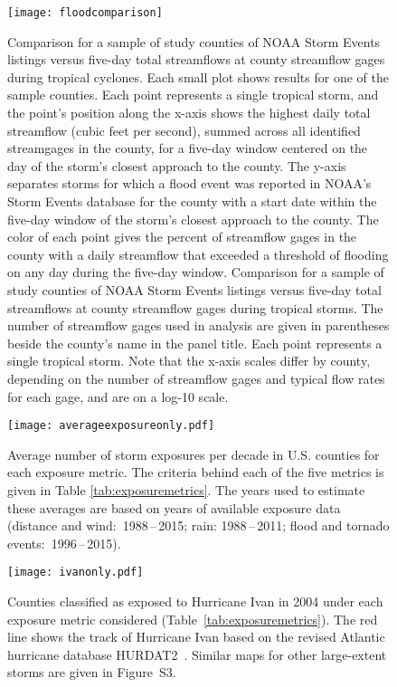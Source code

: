 \begin{figure}[tbhp!]
\centering
\texttt{[image: floodcomparison]}
\caption{Comparison for a sample of study counties of NOAA Storm Events 
	listings versus five-day total streamflows at county streamflow 
	gages during tropical cyclones. Each small plot shows results for 
	one of the sample counties. Each point represents a single tropical 
	storm, and the point's position along the x-axis shows the highest 
	daily total streamflow (cubic feet per second), summed across all 
	identified streamgages in the county, for a five-day window centered 
	on the day of the storm's closest approach to the county. The y-axis 
	separates storms for which a flood event was reported in NOAA's Storm Events 
	database for the county with a start date within the five-day window 
	of the storm's closest approach to the county. The color of each point 
	gives the percent of streamflow gages in the county with a daily streamflow 
	that exceeded a threshold of flooding on any day during the five-day window.
	Comparison for a sample of study counties of NOAA Storm Events 
	listings versus five-day total streamflows at county streamflow gages during 
	tropical storms. The number of streamflow gages used in analysis are given in 
	parentheses beside the county's name in the panel title. Each point represents 
	a single tropical storm. Note that the x-axis scales differ by county, 
	depending on the number of streamflow gages and typical flow rates for each 
	gage, and are on a log-10 scale.}
\label{fig:floodcomparison}
\end{figure}

\clearpage

\begin{figure}%
\centering
\texttt{[image: averageexposureonly.pdf]} 
\caption{Average number of storm exposures per decade in U.S. counties for each 
	exposure metric. The criteria behind each of the five metrics is given in 
	Table \ref{tab:exposuremetrics}. The years used to estimate these averages 
	are based on years of available exposure data 
	(distance and wind:~1988\,--\,2015; rain: 1988\,--\,2011; 
	flood and tornado events:~1996\,--\,2015). } 
\label{fig:averageexposure} 
\end{figure}

\clearpage

\begin{figure}%
\centering
\texttt{[image: ivanonly.pdf]}
\caption{Counties classified as exposed to Hurricane Ivan in 2004 under each
exposure metric considered (Table~\ref{tab:exposuremetrics}). The red line
shows the track of Hurricane Ivan based on the revised Atlantic hurricane
database \ac{HURDAT2}~\parencite{landsea2013}.  Similar maps for other
large-extent storms are given in Figure~S3.}
\label{fig:ivanexposure} 
\end{figure}


